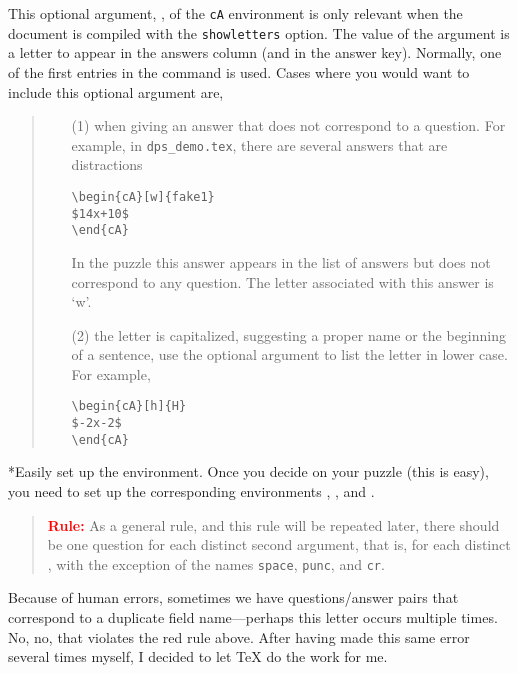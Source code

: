 \documentclass{article}
\makeatletter
\renewcommand{\paragraph}
    {\@startsection{paragraph}{4}{0pt}{6pt}{-3pt}
    {\normalfont\normalsize\bfseries}}
\makeatother
\begin{document}
This optional argument, , of the \texttt{cA} environment is
only relevant when the document is compiled with the \texttt{showletters}
option. The value of the argument is a letter to appear in the answers column
(and in the answer key). Normally, one of the first entries in the
 command is used. Cases where you would want to include
this optional argument are,
\begin{quote}
\begin{enumerate}
\item[(1)] when giving an answer that does not correspond to a question.
    For example, in \texttt{dps\_demo.tex}, there are several answers that
    are distractions
\begin{Verbatim}[xleftmargin=\amtIndent]
\begin{cA}[w]{fake1}
$14x+10$
\end{cA}
\end{Verbatim}
In the puzzle this answer appears in the list of answers but does not correspond
to any question. The letter associated with this answer is `w'.

\item[(2)] the letter is capitalized, suggesting a proper name or the
beginning of a sentence, use the optional argument to list the letter in
lower case. For example,
\begin{Verbatim}[xleftmargin=\amtIndent]
\begin{cA}[h]{H}
$-2x-2$
\end{cA}
\end{Verbatim}
\end{enumerate}
\end{quote}

\paragraph*{Easily set up the  environment.} Once you
decide on your puzzle (this is easy), you need to set up the corresponding
environments , , and .
\begin{quote}
\textbf{\textcolor{red}{Rule:}} As a general rule, and this rule will be
repeated later, there should be one question for each distinct second
argument, that is, for each distinct , with the exception of
the names \texttt{space}, \texttt{punc}, and \texttt{cr}.
\end{quote}
Because of human errors, sometimes we have questions/\allowbreak answer pairs
that correspond to a duplicate field name---perhaps this letter occurs
multiple times. No, no, that violates the red rule above. After having made
this same error several times myself, I decided to let {\TeX} do the work for
me.
\end{document}
